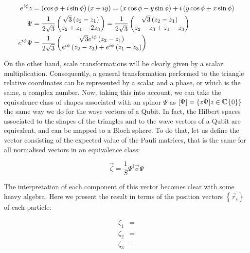 \begin{align*}
e^{i\phi}z &= \left( \cos{\phi}+i\sin{\phi} \right)\left( x+iy \right) = \left( x\cos{\phi}-y\sin{\phi} \right) + i\left( y\cos{\phi}+x\sin{\phi} \right)\\
\Psi &= \frac{1}{2\sqrt{3}}\begin{pmatrix}\sqrt{3}\left( z_{2}-z_{1} \right)\\
z_{2}+z_{1}-2z_{3}\end{pmatrix}=\frac{1}{2\sqrt{3}}\begin{pmatrix}\sqrt{3}\left( z_{2}-z_{1} \right)\\
z_{2}-z_3+ z_{1}-z_{3}\end{pmatrix}\\
e^{i\phi}\Psi &= \frac{1}{2\sqrt{3}}\begin{pmatrix}\sqrt{3}e^{i\phi}\left( z_{2}-z_{1} \right)\\
e^{i\phi}\left( z_{2}-z_3 \right)+ e^{i\phi}\left( z_{1}-z_{3} \right)\end{pmatrix}
\end{align*}

On the other hand, scale transformations will be clearly given by a scalar multiplication. Consequently, a general transformation performed to the triangle relative coordinates can be represented by a scalar and a phase, or which is the same, a complex number. Now, taking this into account, we can take the equivalence class of shapes associated with an spinor $\Psi$ as $\left[ \Psi \right] = \left\{ z\Psi | z \in \mathbb{C} \\ \left\{ 0 \right\} \right\}$ the same way we do for the wave vectors of a Qubit. In fact, the Hilbert spaces associated to the shapes of the triangles and to the wave vectors of a Qubit are equivalent, and can be mapped to a Bloch sphere. To do that, let us define the vector consisting of the expected value of the Pauli matrices, that is the same for all normalised vectors in an equivalence class:

\begin{equation}
\vec{\zeta} = \frac{1}{S} \Psi^{\dagger}\vec{\sigma}\Psi
\end{equation}

The interpretation of each component of this vector becomes clear with some heavy algebra. Here we present the result in terms of the position vectors $\left\{ \vec{r}_i \right\} $ of each particle:

\begin{align*}
\zeta_1 &= \\
\zeta_2 &= \\
\zeta_3 &= \\
\end{align*}








